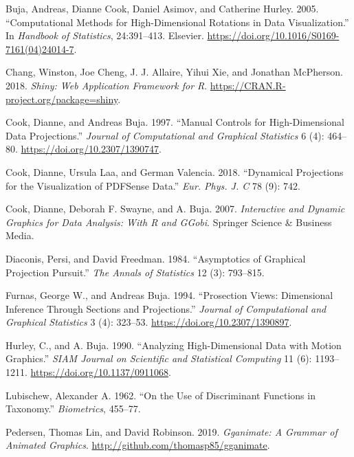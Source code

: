 \leavevmode\hypertarget{ref-buja_computational_2005}{}%
Buja, Andreas, Dianne Cook, Daniel Asimov, and Catherine Hurley. 2005.
``Computational Methods for High-Dimensional Rotations in Data
Visualization.'' In \emph{Handbook of Statistics}, 24:391--413.
Elsevier. \url{https://doi.org/10.1016/S0169-7161(04)24014-7}.

\leavevmode\hypertarget{ref-chang_shiny:_2018}{}%
Chang, Winston, Joe Cheng, J. J. Allaire, Yihui Xie, and Jonathan
McPherson. 2018. \emph{Shiny: Web Application Framework for R}.
\url{https://CRAN.R-project.org/package=shiny}.

\leavevmode\hypertarget{ref-cook_manual_1997}{}%
Cook, Dianne, and Andreas Buja. 1997. ``Manual Controls for
High-Dimensional Data Projections.'' \emph{Journal of Computational and
Graphical Statistics} 6 (4): 464--80.
\url{https://doi.org/10.2307/1390747}.

\leavevmode\hypertarget{ref-cook_dynamical_2018}{}%
Cook, Dianne, Ursula Laa, and German Valencia. 2018. ``Dynamical
Projections for the Visualization of PDFSense Data.'' \emph{Eur. Phys.
J. C} 78 (9): 742.

\leavevmode\hypertarget{ref-cook_interactive_2007}{}%
Cook, Dianne, Deborah F. Swayne, and A. Buja. 2007. \emph{Interactive
and Dynamic Graphics for Data Analysis: With R and GGobi}. Springer
Science \& Business Media.

\leavevmode\hypertarget{ref-diaconis_asymptotics_1984}{}%
Diaconis, Persi, and David Freedman. 1984. ``Asymptotics of Graphical
Projection Pursuit.'' \emph{The Annals of Statistics} 12 (3): 793--815.

\leavevmode\hypertarget{ref-furnas_prosection_1994}{}%
Furnas, George W., and Andreas Buja. 1994. ``Prosection Views:
Dimensional Inference Through Sections and Projections.'' \emph{Journal
of Computational and Graphical Statistics} 3 (4): 323--53.
\url{https://doi.org/10.2307/1390897}.

\leavevmode\hypertarget{ref-hurley_analyzing_1990}{}%
Hurley, C., and A. Buja. 1990. ``Analyzing High-Dimensional Data with
Motion Graphics.'' \emph{SIAM Journal on Scientific and Statistical
Computing} 11 (6): 1193--1211. \url{https://doi.org/10.1137/0911068}.

\leavevmode\hypertarget{ref-lubischew_use_1962}{}%
Lubischew, Alexander A. 1962. ``On the Use of Discriminant Functions in
Taxonomy.'' \emph{Biometrics}, 455--77.

\leavevmode\hypertarget{ref-pedersen_gganimate:_2019}{}%
Pedersen, Thomas Lin, and David Robinson. 2019. \emph{Gganimate: A
Grammar of Animated Graphics}.
\url{http://github.com/thomasp85/gganimate}.


